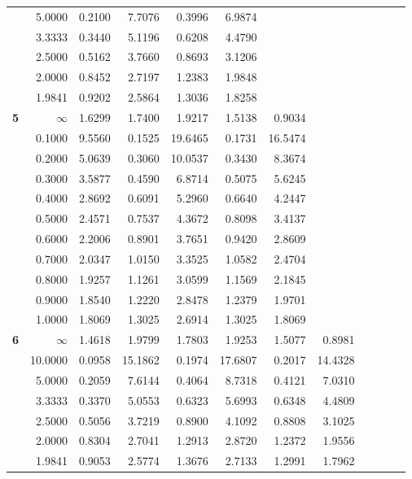 \begin{table}[!htb]
\begin{center}
{\begin{tabular}{|c||r|r|r|r|r|r|r|r|r|r|r|}
&5.0000&0.2100&7.7076&0.3996&6.9874&     &     &     &     &     &     \\
&3.3333&0.3440&5.1196&0.6208&4.4790&     &     &     &     &     &     \\
&2.5000&0.5162&3.7660&0.8693&3.1206&     &     &     &     &     &     \\
&2.0000&0.8452&2.7197&1.2383&1.9848&     &     &     &     &     &     \\
&1.9841&0.9202&2.5864&1.3036&1.8258&     &     &     &     &     &     \\ \hline
\textbf{ 5}&$\infty$&1.6299&1.7400&1.9217&1.5138&0.9034&     &     &     &     &     \\
&0.1000&9.5560&0.1525&19.6465&0.1731&16.5474&     &     &     &     &     \\
&0.2000&5.0639&0.3060&10.0537&0.3430&8.3674&     &     &     &     &     \\
&0.3000&3.5877&0.4590&6.8714&0.5075&5.6245&     &     &     &     &     \\
&0.4000&2.8692&0.6091&5.2960&0.6640&4.2447&     &     &     &     &     \\
&0.5000&2.4571&0.7537&4.3672&0.8098&3.4137&     &     &     &     &     \\
&0.6000&2.2006&0.8901&3.7651&0.9420&2.8609&     &     &     &     &     \\
&0.7000&2.0347&1.0150&3.3525&1.0582&2.4704&     &     &     &     &     \\
&0.8000&1.9257&1.1261&3.0599&1.1569&2.1845&     &     &     &     &     \\
&0.9000&1.8540&1.2220&2.8478&1.2379&1.9701&     &     &     &     &     \\
&1.0000&1.8069&1.3025&2.6914&1.3025&1.8069&     &     &     &     &     \\ \hline
\textbf{ 6}&$\infty$&1.4618&1.9799&1.7803&1.9253&1.5077&0.8981&     &     &     &     \\
&10.0000&0.0958&15.1862&0.1974&17.6807&0.2017&14.4328&     &     &     &     \\
&5.0000&0.2059&7.6144&0.4064&8.7318&0.4121&7.0310&     &     &     &     \\
&3.3333&0.3370&5.0553&0.6323&5.6993&0.6348&4.4809&     &     &     &     \\
&2.5000&0.5056&3.7219&0.8900&4.1092&0.8808&3.1025&     &     &     &     \\
&2.0000&0.8304&2.7041&1.2913&2.8720&1.2372&1.9556&     &     &     &     \\
&1.9841&0.9053&2.5774&1.3676&2.7133&1.2991&1.7962&     &     &     &     \\ \hline

\end{tabular}}
\end{center}
\end{table}
